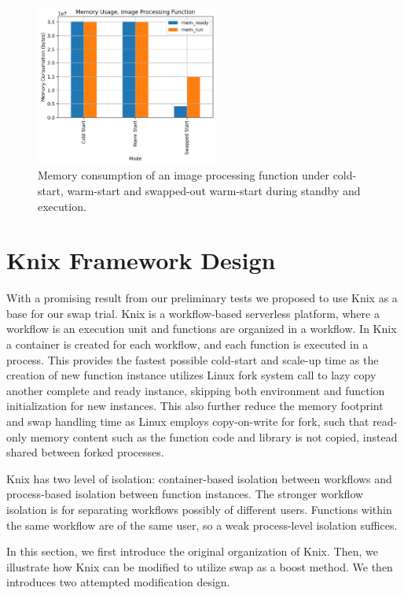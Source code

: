 \documentclass[conference]{IEEEtran}
\begin{document}
\begin{figure}
    \centering
    \includegraphics[width=6cm]{image_b.png}
    \caption{Memory consumption of an image processing function under cold-start, warm-start and swapped-out warm-start during standby and execution.}
    \label{image_b}
\end{figure}

\section{Knix Framework Design}

With a promising result from our preliminary tests we proposed to use Knix\cite{akkusSANDHighPerformanceServerless} as a base for our swap trial. Knix is a workflow-based serverless platform, where a workflow is an execution unit and functions are organized in a workflow. In Knix a container is created for each workflow, and each function is executed in a process. This provides the fastest possible cold-start and scale-up time as the creation of new function instance utilizes Linux fork system call to lazy copy another complete and ready instance, skipping both environment and function initialization for new instances. This also further reduce the memory footprint and swap handling time as Linux employs copy-on-write for fork, such that read-only memory content such as the function code and library is not copied, instead shared between forked processes.  

Knix has two level of isolation: container-based isolation between workflows and process-based isolation between function instances. The stronger workflow isolation is for separating workflows possibly of different users. Functions within the same workflow are of the same user, so a weak process-level isolation suffices.

In this section, we first introduce the original organization of Knix. Then, we illustrate how Knix can be modified to utilize swap as a boost method. We then introduces two attempted modification design.
\end{document}

